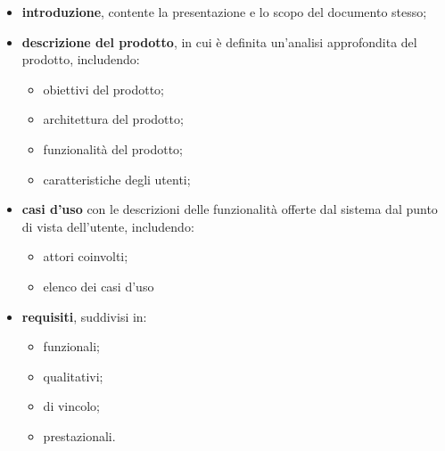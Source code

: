 \begin{itemize}
	\item \textbf{introduzione}, contente la presentazione e lo scopo del documento stesso;
	\item \textbf{descrizione del prodotto}, in cui è definita un'analisi approfondita del prodotto, includendo:
	      \begin{itemize}
		      \item obiettivi del prodotto;
		      \item architettura del prodotto;
		      \item funzionalità del prodotto;
		      \item caratteristiche degli utenti;
	      \end{itemize}
	\item \textbf{casi d'uso} con le descrizioni delle funzionalità offerte dal sistema dal punto di vista dell'utente, includendo:
	      \begin{itemize}
		      \item attori coinvolti;
		      \item elenco dei casi d'uso
	      \end{itemize}
	\item \textbf{requisiti}, suddivisi in:
	      \begin{itemize}
		      \item funzionali;
		      \item qualitativi;
		      \item di vincolo;
		      \item prestazionali.
	      \end{itemize}
\end{itemize}

